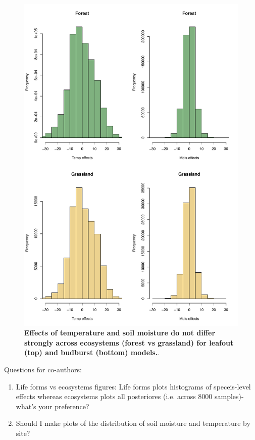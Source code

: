 \documentclass{article}
\begin{document}
 \begin{figure}[h]
\centering
 \includegraphics{../../Analyses/soilmoisture/figures/histloecos.pdf}
 \caption{\textbf{Effects of temperature and soil moisture do not differ strongly across ecosystems (forest vs grassland) for leafout (top) and budburst (bottom) models.}.}
 \label{fig:forms}
 \end{figure}
 
 Questions for co-authors:
 \begin{enumerate}
 \item Life forms vs ecosystems figures: Life forms plots histograms of speceis-level effects whereas ecosystems plots all posteriores (i.e. across 8000 samples)- what's your preference?
 \item Should I make plots of the distribution of soil moisture and temperature by site?

 \end{enumerate}
 
\end{document}
